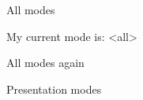 \documentclass{beamer}
\begin{document}
    All modes

    My current mode is:  \makeatletter\beamer@mode\makeatother
    \mode<all>

    All modes again


    Presentation modes
\end{document}
